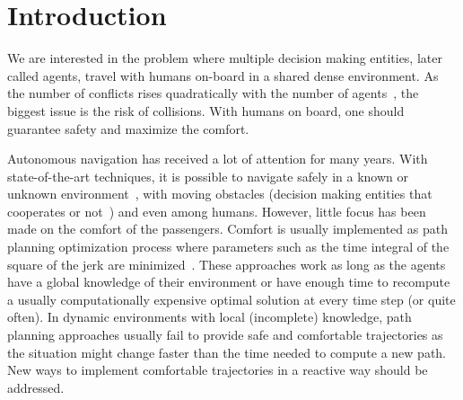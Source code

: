 \section{Introduction}



We are interested in the problem where multiple decision making entities, later called agents, travel with humans on-board in a shared dense environment. As the number of conflicts rises quadratically with the number of agents~\cite{jardin_analytical_2005}, the biggest issue is the risk of collisions. With humans on board, one should guarantee safety and maximize the comfort. 

Autonomous navigation has received a lot of attention for many years. With state-of-the-art techniques, it is possible to navigate safely in a known or unknown environment~\cite{scherer_flying_2008}, with moving obstacles (decision making entities that cooperates or not~\cite{nordlund_probabilistic_2011}) and even among humans\cite{guzzi_human-friendly_2013}. However, little focus has been made on the comfort of the passengers. Comfort is usually implemented as path planning optimization process where parameters such as the time integral of the square of the jerk are minimized~\cite{gulati_framework_2009, morales_human-comfortable_2013}. These approaches work as long as the agents have a global knowledge of their environment or have enough time to recompute a usually computationally expensive optimal solution at every time step (or quite often). In dynamic environments with local (incomplete) knowledge, path planning approaches usually fail to provide safe and comfortable trajectories as the situation might change faster than the time needed to compute a new path. New ways to implement comfortable trajectories in a reactive way should be addressed. 


